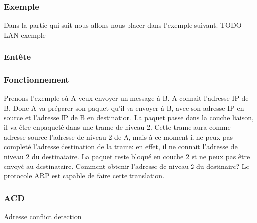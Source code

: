 \documentclass[twoside,openright,a4paper,11pt,french]{article}
\begin{document}
\subsubsection{Exemple}
Dans la partie qui suit nous allons nous placer dans l'exemple suivant.
TODO LAN exemple
\subsubsection{Entête}

\subsubsection{Fonctionnement}
Prenons l'exemple où A veux envoyer un message à B. A connait l'adresse IP de
B. Donc A va préparer son paquet qu'il va envoyer à B, avec son adresse IP en
source et l'adresse IP de B en destination. La paquet passe dans la couche
liaison, il va être enpaqueté dans une trame de niveau 2. Cette trame aura
comme adresse source l'adresse de niveau 2 de A, mais à ce moment il ne peux
pas completé l'adresse destination de la trame: en effet, il ne connait
l'adresse de niveau 2 du destinataire. La paquet reste bloqué en couche 2 et ne
peux pas être envoyé au destinataire. Comment obtenir l'adresse de niveau 2 du destinaire?
Le protocole ARP est capable de faire cette translation.

\subsubsection{ACD}
Adresse conflict detection
\end{document}
